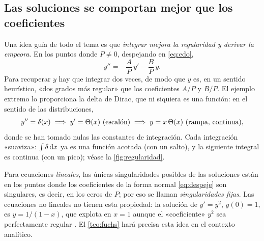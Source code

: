 \subsection{Las soluciones se comportan mejor que los coeficientes}\label{sec:regularidad}
Una idea guía de todo el tema es que \emph{integrar mejora la regularidad y
derivar la empeora}. En los puntos donde $P\neq0$, despejando en
\eqref{eq:edo},
\begin{equation}\label{eq:despeje}
  y''=-\frac{A}{P}\,y'-\frac{B}{P}\,y .
\end{equation}
Para recuperar $y$ hay que integrar dos veces, de modo que $y$ es, en un
sentido heurístico, «dos grados más regular» que los coeficientes $A/P$ y
$B/P$. El ejemplo extremo lo proporciona la delta de Dirac, que ni
siquiera es una función: en el sentido de las distribuciones,
\begin{equation}\label{eq:delta}
  y''=\delta(x)\;\Longrightarrow\;y'=\Theta(x)\ \text{(escalón)}
  \;\Longrightarrow\;y=x\,\Theta(x)\ \text{(rampa, continua)},
\end{equation}
donde se han tomado nulas las constantes de integración. Cada integración
«suaviza»: $\int\delta\,\mathrm{d} x$ ya es una función acotada (con un salto), y
la siguiente integral es continua (con un pico); véase la \cref{fig:regularidad}.



\begin{observacion}\label{obs:fijas}
Para ecuaciones \emph{lineales}, las únicas singularidades posibles de las
soluciones están en los puntos donde los coeficientes de la forma normal
\eqref{eq:despeje} son singulares, es decir, en los ceros de $P$; por eso se
llaman \emph{singularidades fijas}. Las ecuaciones no lineales no tienen esta
propiedad: la solución de $y'=y^{2}$, $y(0)=1$, es $y=1/(1-x)$, que
explota en $x=1$ aunque el «coeficiente» $y^{2}$ sea perfectamente regular
\cite[cap.~3]{BENDER}. El \cref{teo:fuchs} hará precisa esta idea en el
contexto analítico.
\end{observacion}
